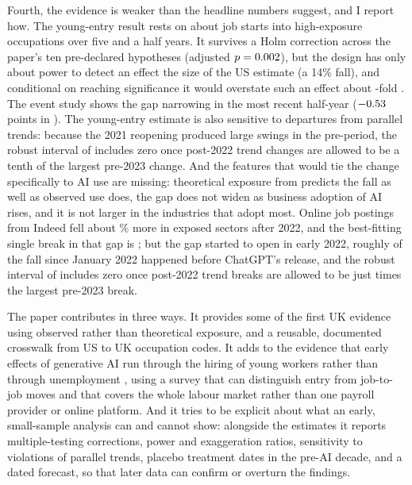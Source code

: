 \documentclass[11pt]{article}
\begin{document}
Fourth, the evidence is weaker than the headline numbers suggest, and I report how. The young-entry result rests on about \entryStartsHigh{} job starts into high-exposure occupations over five and a half years. It survives a Holm correction across the paper's ten pre-declared hypotheses (adjusted $p=0.002$), but the design has only about \powerUS{} power to detect an effect the size of the US estimate (a 14\% fall), and conditional on reaching significance it would overstate such an effect about \exaggUS-fold \citep{gelman2014}. The event study shows the gap narrowing in the most recent half-year ($-0.53$ points in \esLastHalf{}). The young-entry estimate is also sensitive to departures from parallel trends: because the 2021 reopening produced large swings in the pre-period, the robust interval of \citet{rambachan2023} includes zero once post-2022 trend changes are allowed to be a tenth of the largest pre-2023 change. And the features that would tie the change specifically to AI use are missing: theoretical exposure from \citet{eloundou2024} predicts the fall as well as observed use does, the gap does not widen as business adoption of AI rises, and it is not larger in the industries that adopt most. Online job postings from Indeed fell about \postRawAbs\% more in exposed sectors after 2022, and the best-fitting single break in that gap is \breakLevel{}; but the gap started to open in early 2022, roughly \postShareBefore{} of the fall since January 2022 happened before ChatGPT's release, and the robust interval of \citet{rambachan2023} includes zero once post-2022 trend breaks are allowed to be just \bdPost{} times the largest pre-2023 break.

The paper contributes in three ways. It provides some of the first UK evidence using observed rather than theoretical exposure, and a reusable, documented crosswalk from US to UK occupation codes. It adds to the evidence that early effects of generative AI run through the hiring of young workers rather than through unemployment \citep{brynjolfsson2025canaries,hosseini2025,teeselink2025}, using a survey that can distinguish entry from job-to-job moves and that covers the whole labour market rather than one payroll provider or online platform. And it tries to be explicit about what an early, small-sample analysis can and cannot show: alongside the estimates it reports multiple-testing corrections, power and exaggeration ratios, sensitivity to violations of parallel trends, placebo treatment dates in the pre-AI decade, and a dated forecast, so that later data can confirm or overturn the findings.
\end{document}
